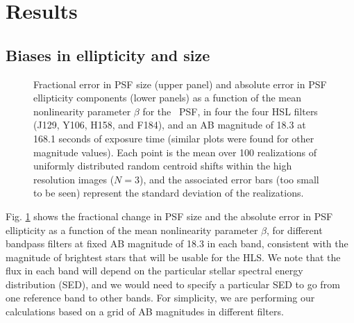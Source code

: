 \documentclass[11pt,preprint,flushrt]{aastex}
\begin{document}
\section{Results}
\label{results}
\subsection{Biases in ellipticity and size}

\begin{figure}[!h]
\centering
{}
\caption{Fractional error in PSF size (upper panel) and absolute error in PSF ellipticity components (lower panels) as a function of the mean nonlinearity parameter $\beta$ for the \wfa\ PSF, in four the four HSL filters (J129, Y106, H158, and F184), and an AB magnitude of 18.3 at 168.1 seconds of exposure time (similar plots were found for other magnitude values). Each point is the mean over 100 realizations of uniformly distributed random centroid shifts within the high resolution images ($N=3$), and the associated error bars (too small to be seen) represent the standard deviation of the realizations.}
\label{f2}
\end{figure}

Fig. \ref{f2} shows the fractional change in PSF size and the absolute error in PSF ellipticity as a function of the mean nonlinearity parameter $\beta$, for different bandpass filters at fixed AB magnitude of 18.3 in each band, consistent with the magnitude of brightest stars that will be usable for the HLS. We note that the flux in each band will depend on the particular stellar spectral energy distribution (SED), and we would need to specify a particular SED to go from one reference band to other bands. For simplicity, we are performing our calculations based on a grid of AB magnitudes in different filters. 
\end{document}

